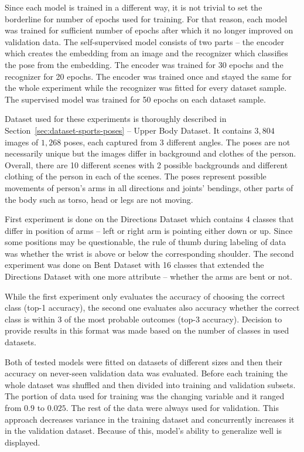 Since each model is trained in a different way, it is not trivial to set the borderline for number of epochs used for training. For that reason, each model was trained for sufficient number of epochs after which it no longer improved on validation data. The self-supervised model consists of two parts -- the encoder which creates the embedding from an image and the recognizer which classifies the pose from the embedding. The encoder was trained for 30 epochs and the recognizer for 20 epochs. The encoder was trained once and stayed the same for the whole experiment while the recognizer was fitted for every dataset sample. The supervised model was trained for 50 epochs on each dataset sample.

Dataset used for these experiments is thoroughly described in Section~\ref{sec:dataset-sports-poses} -- Upper Body Dataset. It contains $3{,}804$ images of $1{,}268$ poses, each captured from 3 different angles. The poses are not necessarily unique but the images differ in background and clothes of the person. Overall, there are 10 different scenes with 2 possible backgrounds and different clothing of the person in each of the scenes. The poses represent possible movements of person's arms in all directions and joints' bendings, other parts of the body such as torso, head or legs are not moving.

First experiment is done on the Directions Dataset which contains 4 classes that differ in position of arms -- left or right arm is pointing either down or up. Since some positions may be questionable, the rule of thumb during labeling of data was whether the wrist is above or below the corresponding shoulder. The second experiment was done on Bent Dataset with 16 classes that extended the Directions Dataset with one more attribute -- whether the arms are bent or not.

While the first experiment only evaluates the accuracy of choosing the correct class (top-1 accuracy), the second one evaluates also accuracy whether the correct class is within 3 of the most probable outcomes (top-3 accuracy). Decision to provide results in this format was made based on the number of classes in used datasets.

Both of tested models were fitted on datasets of different sizes and then their accuracy on never-seen validation data was evaluated. Before each training the whole dataset was shuffled and then divided into training and validation subsets. The portion of data used for training was the changing variable and it ranged from $0.9$ to $0.025$. The rest of the data were always used for validation. This approach decreases variance in the training dataset and concurrently increases it in the validation dataset. Because of this, model's ability to generalize well is displayed.

